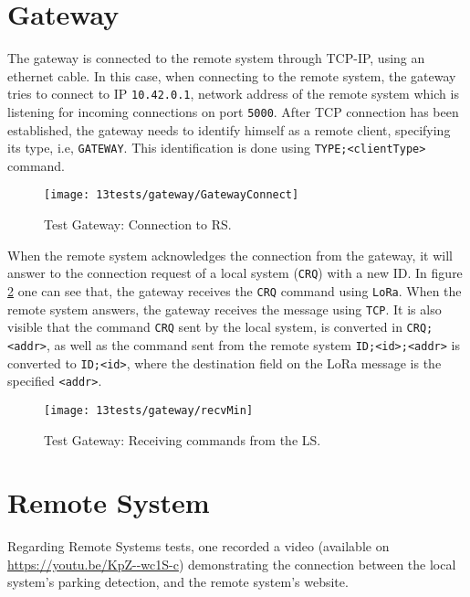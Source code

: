 \section{Gateway}
The gateway is connected to the remote system through TCP-IP, using an ethernet cable. In this case, when connecting to the remote system, the gateway tries to connect to IP \verb|10.42.0.1|, network address of the remote system which is listening for incoming connections on port \verb|5000|. After TCP connection has been established, the gateway needs to identify himself as a remote client, specifying its type, i.e, \verb|GATEWAY|. This identification is done using \verb|TYPE;<clientType>| command.

\begin{figure}[H]
	\centering	
	\texttt{[image: 13tests/gateway/GatewayConnect]}
	\caption{Test Gateway: Connection to RS.}
	\label{fig:}
\end{figure}

When the remote system acknowledges the connection from the gateway, it will answer to the connection request of a local system (\verb|CRQ|) with a new ID. In figure \ref{fig:recvMin} one can see that, the gateway receives the \verb|CRQ| command using \verb|LoRa|. When the remote system answers, the gateway receives the message using \verb|TCP|. It is also visible that the command \verb|CRQ| sent by the local system, is converted in \verb|CRQ;<addr>|, as well as the command sent from the remote system \verb|ID;<id>;<addr>| is converted to \verb|ID;<id>|, where the destination field on the LoRa message is the specified \verb|<addr>|.

\begin{figure}[H]
	\centering	
	\texttt{[image: 13tests/gateway/recvMin]}
	\caption{Test Gateway: Receiving commands from the LS.}
	\label{fig:recvMin}
\end{figure}

\section{Remote System}

Regarding Remote Systems tests, one recorded a video (available on \linebreak \url{https://youtu.be/KpZ--wc1S-c}) demonstrating the connection between the local system's parking detection, and the remote system's website.

